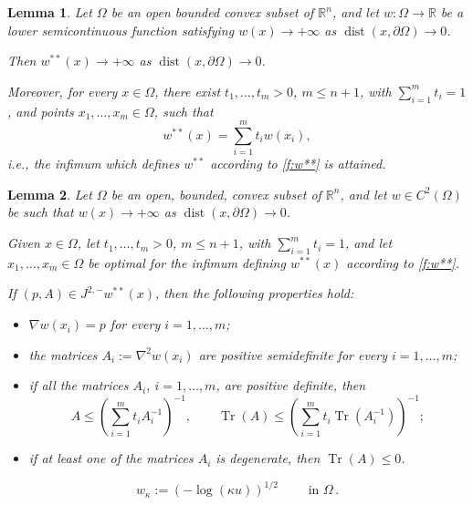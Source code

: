 \documentclass[10pt,a4paper]{amsart}
\newtheorem{lemma}{Lemma}
\def\Om{\Omega}
\def\R{\mathbb{R}}
\DeclareMathOperator{\Tr}{Tr}
\DeclareMathOperator{\dist}{dist}
\def\k{\kappa}
\def\subjet{J^{2,-}}
\begin{document}
\begin{lemma}
\label{l:bdr}
Let $\Omega$ be an open bounded convex subset of $\R^n$,  and 
let $w\colon\Omega\to\R$ be a lower semicontinuous function
satisfying
$w(x) \to +\infty$ as $\dist(x, \partial\Omega) \to 0$.

Then $w^{**}(x) \to +\infty$ 
as $\dist(x, \partial\Omega) \to 0$.

Moreover, for every $x\in\Omega$, there exist
$t_1, \ldots, t_m > 0$, $m\leq n+1$, with $\sum_{i=1}^m t_i = 1$,
and points $x_1, \ldots, x_m \in \Omega$, such that 
\begin{equation}
\label{f:min}
w^{**}(x) = \sum_{i=1}^m t_i w(x_i),
\end{equation}
i.e., the infimum which defines $w ^ {**}$ according to \eqref{f:w**} is attained.
\end{lemma}

\begin{lemma}
\label{l:ALLp1}
Let $\Omega$ be an open, bounded, convex subset of $\R^n$,  and 
let $w\in C^2(\Omega)$ be such that $w(x) \to +\infty$ as $\dist(x, \partial\Omega) \to 0$.

Given $x\in\Omega$, let $t_1, \ldots, t_m > 0$, $m\leq n+1$, with $\sum_{i=1}^m t_i = 1$,
and let $x_1, \ldots, x_m \in \Omega$ be optimal for the infimum defining $w ^ {**} (x)$ according to \eqref{f:w**}.

If $(p,A) \in \subjet   w^{**}(x)$,  then 
the following properties hold:
\begin{itemize}
\item[(i)] $\nabla w(x_i) = p$
for every $i = 1,\ldots,m$;
\smallskip

\item[(ii)] the matrices $A_i := \nabla ^2 w(x_i)$ are positive semidefinite for every $i = 1,\ldots,m$;
\smallskip

\item[(iii)] if all the matrices $A_i$, $i=1,\ldots,m$, are positive definite,
then
\[
A \leq \left(\sum_{i=1}^m t_i A_i^{-1}\right)^{-1},
\qquad
\Tr(A) \leq 
\left(\sum_{i=1}^m t_i \Tr (A_i^{-1})\right)^{-1};
\]

\item[(iv)] if at least one of the matrices $A_i$ is degenerate, then
$\Tr(A) \leq 0$.
\end{itemize}
\end{lemma}

\begin{equation}\label{f:norm} 
w  _\k:= (- \log (\k u) ) ^ { 1/2} \qquad \text{ in } \Om\,. 
\end{equation}   
\end{document}
